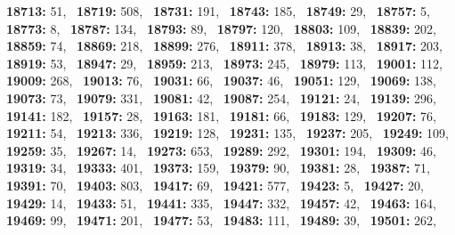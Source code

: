 \textbf{18713:} 51,\allowbreak~ 
\textbf{18719:} 508,\allowbreak~ 
\textbf{18731:} 191,\allowbreak~ 
\textbf{18743:} 185,\allowbreak~ 
\textbf{18749:} 29,\allowbreak~ 
\textbf{18757:} 5,\allowbreak~ 
\textbf{18773:} 8,\allowbreak~ 
\textbf{18787:} 134,\allowbreak~ 
\textbf{18793:} 89,\allowbreak~ 
\textbf{18797:} 120,\allowbreak~ 
\textbf{18803:} 109,\allowbreak~ 
\textbf{18839:} 202,\allowbreak~ 
\textbf{18859:} 74,\allowbreak~ 
\textbf{18869:} 218,\allowbreak~ 
\textbf{18899:} 276,\allowbreak~ 
\textbf{18911:} 378,\allowbreak~ 
\textbf{18913:} 38,\allowbreak~ 
\textbf{18917:} 203,\allowbreak~ 
\textbf{18919:} 53,\allowbreak~ 
\textbf{18947:} 29,\allowbreak~ 
\textbf{18959:} 213,\allowbreak~ 
\textbf{18973:} 245,\allowbreak~ 
\textbf{18979:} 113,\allowbreak~ 
\textbf{19001:} 112,\allowbreak~ 
\textbf{19009:} 268,\allowbreak~ 
\textbf{19013:} 76,\allowbreak~ 
\textbf{19031:} 66,\allowbreak~ 
\textbf{19037:} 46,\allowbreak~ 
\textbf{19051:} 129,\allowbreak~ 
\textbf{19069:} 138,\allowbreak~ 
\textbf{19073:} 73,\allowbreak~ 
\textbf{19079:} 331,\allowbreak~ 
\textbf{19081:} 42,\allowbreak~ 
\textbf{19087:} 254,\allowbreak~ 
\textbf{19121:} 24,\allowbreak~ 
\textbf{19139:} 296,\allowbreak~ 
\textbf{19141:} 182,\allowbreak~ 
\textbf{19157:} 28,\allowbreak~ 
\textbf{19163:} 181,\allowbreak~ 
\textbf{19181:} 66,\allowbreak~ 
\textbf{19183:} 129,\allowbreak~ 
\textbf{19207:} 76,\allowbreak~ 
\textbf{19211:} 54,\allowbreak~ 
\textbf{19213:} 336,\allowbreak~ 
\textbf{19219:} 128,\allowbreak~ 
\textbf{19231:} 135,\allowbreak~ 
\textbf{19237:} 205,\allowbreak~ 
\textbf{19249:} 109,\allowbreak~ 
\textbf{19259:} 35,\allowbreak~ 
\textbf{19267:} 14,\allowbreak~ 
\textbf{19273:} 653,\allowbreak~ 
\textbf{19289:} 292,\allowbreak~ 
\textbf{19301:} 194,\allowbreak~ 
\textbf{19309:} 46,\allowbreak~ 
\textbf{19319:} 34,\allowbreak~ 
\textbf{19333:} 401,\allowbreak~ 
\textbf{19373:} 159,\allowbreak~ 
\textbf{19379:} 90,\allowbreak~ 
\textbf{19381:} 28,\allowbreak~ 
\textbf{19387:} 71,\allowbreak~ 
\textbf{19391:} 70,\allowbreak~ 
\textbf{19403:} 803,\allowbreak~ 
\textbf{19417:} 69,\allowbreak~ 
\textbf{19421:} 577,\allowbreak~ 
\textbf{19423:} 5,\allowbreak~ 
\textbf{19427:} 20,\allowbreak~ 
\textbf{19429:} 14,\allowbreak~ 
\textbf{19433:} 51,\allowbreak~ 
\textbf{19441:} 335,\allowbreak~ 
\textbf{19447:} 332,\allowbreak~ 
\textbf{19457:} 42,\allowbreak~ 
\textbf{19463:} 164,\allowbreak~ 
\textbf{19469:} 99,\allowbreak~ 
\textbf{19471:} 201,\allowbreak~ 
\textbf{19477:} 53,\allowbreak~ 
\textbf{19483:} 111,\allowbreak~ 
\textbf{19489:} 39,\allowbreak~ 
\textbf{19501:} 262,\allowbreak~ 
